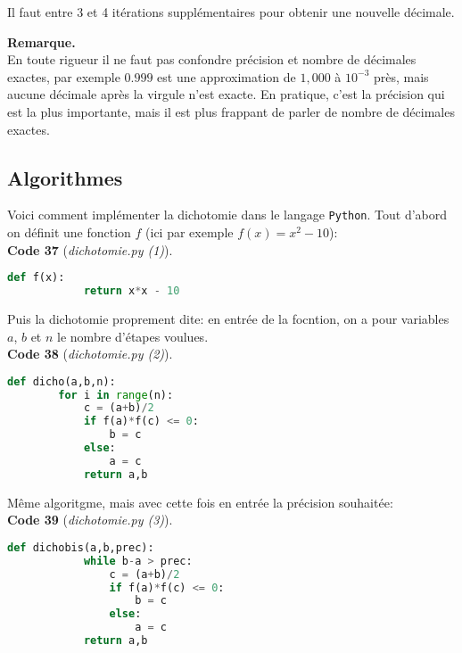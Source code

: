 \documentclass[a4paper,12pt]{article}
\begin{document}
    Il faut entre 3 et 4 itérations supplémentaires pour obtenir une nouvelle décimale.

    \vspace{0.5cm}
    
    \textbf{Remarque.} \\
    En toute rigueur il ne faut pas confondre précision et nombre de décimales exactes, par exemple $0.999$ est une approximation de $1,000$ à $10^{-3}$ près, mais aucune décimale après la virgule n'est exacte. En pratique, c'est la précision qui est la plus importante, mais il est plus frappant de parler  de nombre de décimales exactes.

\subsection{Algorithmes}

    Voici comment implémenter la dichotomie dans le langage \texttt{Python}. Tout d'abord on définit une fonction $f$ (ici par exemple $f(x) = x^2 - 10$): \\
    \textbf{Code 37} (\textit{dichotomie.py (1)}).
    \begin{lstlisting}[language=Python]
        def f(x):
            return x*x - 10
    \end{lstlisting}

    \vspace{0.5cm}

    Puis la dichotomie proprement dite: en entrée de la focntion, on a pour variables $a$, $b$ et $n$ le nombre d'étapes voulues. \\
    \textbf{Code 38} (\textit{dichotomie.py (2)}).
    \begin{lstlisting}[language=Python]
    def dicho(a,b,n):
        for i in range(n):
            c = (a+b)/2
            if f(a)*f(c) <= 0:
                b = c 
            else:
                a = c
            return a,b
    \end{lstlisting}

    \vspace{0.5cm}

    Même algoritgme, mais avec cette fois en entrée la précision souhaitée: \\
    \textbf{Code 39} (\textit{dichotomie.py (3)}).
    \begin{lstlisting}[language=Python]
        def dichobis(a,b,prec):
            while b-a > prec:
                c = (a+b)/2
                if f(a)*f(c) <= 0:
                    b = c 
                else:
                    a = c
            return a,b
    \end{lstlisting}
\end{document}
